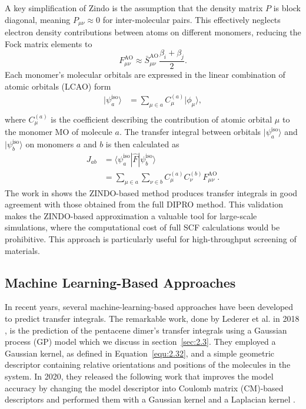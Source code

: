 A key simplification of Zindo is the assumption that the density matrix $P$ is block diagonal, meaning $P_{\mu\nu}\approx0$ for inter-molecular pairs.
This effectively neglects electron density contributions between atoms on different monomers, reducing the Fock matrix elements to 
\begin{equation} \label{equ:2.107}
F^{\text{AO}}_{\mu\nu} \approx 
\bar{S}^{\text{AO}}_{\mu\nu}\frac{\beta_{i} + \beta_{j}}{2}.
\end{equation}
Each monomer's molecular orbitals are expressed in the linear combination of atomic orbitals (LCAO) form
\begin{equation} \label{equ:2.108}
\begin{split}
   |\psi^{\text{iso}}_{a}\rangle  &=
   \sum_{\mu\in a} C^{(a)}_{\mu}|\phi_{\mu}\rangle, \\
\end{split}
\end{equation}
where $ C^{(a)}_{\mu}$ is the coefficient describing the contribution of atomic orbital $\mu$ to the monomer MO of molecule $a$.
The transfer integral between orbitals $|\psi^{\text{iso}}_{a}\rangle$ and $|\psi^{\text{iso}}_{b}\rangle$ on monomers $a$ and $b$ is then calculated as
\begin{equation} \label{equ:2.109}
\begin{split}
    J_{ab} &=
   \langle \psi^{\text{iso}}_{a} |\hat{F}|\psi^{\text{iso}}_{b}\rangle \\
    &=
   \sum_{\mu\in a}\sum_{\nu\in b}C^{(a)}_{\mu}C^{(b)}_{\nu}F^{\text{AO}}_{\mu\nu}.
\end{split}
\end{equation}
The work in \cite{Kirkpatrick2007} shows the ZINDO-based method produces transfer integrals in good agreement with those obtained from the full DIPRO method.
This validation makes the ZINDO-based approximation a valuable tool for large-scale simulations, where the computational cost of full SCF calculations would be prohibitive.
This approach is particularly useful for high-throughput screening of materials.

\subsection{Machine Learning-Based Approaches} \label{subsec:2.6.4}

In recent years, several machine-learning-based approaches have been developed to predict transfer integrals.
The remarkable work, done by Lederer et al. in 2018 \cite{Lederer2018}, is the prediction of the pentacene dimer's transfer integrals using a Gaussian process (GP) model which we discuss in section~\ref{sec:2.3}.
They employed a Gaussian kernel, as defined in Equation~\eqref{equ:2.32}, and a simple geometric descriptor containing relative orientations and positions of the molecules in the system.
In 2020, they released the following work that improves the model accuracy by changing the model descriptor into Coulomb matrix (CM)-based descriptors and performed them with a Gaussian kernel and a Laplacian kernel \cite{Rinderle2020}.

